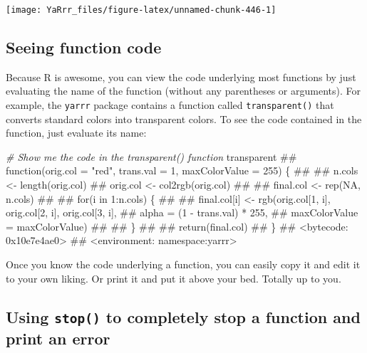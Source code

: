 \documentclass[]{book}
\newenvironment{Shaded}{\begin{snugshade}}{\end{snugshade}}
\newcommand{\CommentTok}[1]{\textcolor[rgb]{0.56,0.35,0.01}{\textit{#1}}}
\newcommand{\NormalTok}[1]{#1}
\theoremstyle{definition}
\theoremstyle{definition}
\theoremstyle{remark}
\begin{document}
\begin{center}\texttt{[image: YaRrr\_files/figure-latex/unnamed-chunk-446-1]} \end{center}

\subsection{Seeing function code}\label{seeing-function-code}

Because R is awesome, you can view the code underlying most functions by
just evaluating the name of the function (without any parentheses or
arguments). For example, the \texttt{yarrr} package contains a function
called \texttt{transparent()} that converts standard colors into
transparent colors. To see the code contained in the function, just
evaluate its name:

\begin{Shaded}
\begin{Highlighting}[]
\CommentTok{# Show me the code in the transparent() function}
\NormalTok{transparent}
\NormalTok{## function(orig.col = "red", trans.val = 1, maxColorValue = 255) \{}
\NormalTok{## }
\NormalTok{##   n.cols <- length(orig.col)}
\NormalTok{##   orig.col <- col2rgb(orig.col)}
\NormalTok{## }
\NormalTok{##   final.col <- rep(NA, n.cols)}
\NormalTok{## }
\NormalTok{##   for(i in 1:n.cols) \{}
\NormalTok{## }
\NormalTok{##     final.col[i] <- rgb(orig.col[1, i], orig.col[2, i], orig.col[3, i],}
\NormalTok{##                         alpha = (1 - trans.val) * 255,}
\NormalTok{##                         maxColorValue = maxColorValue)}
\NormalTok{## }
\NormalTok{##   \}}
\NormalTok{## }
\NormalTok{##   return(final.col)}
\NormalTok{## \}}
\NormalTok{## <bytecode: 0x10e7e4ae0>}
\NormalTok{## <environment: namespace:yarrr>}
\end{Highlighting}
\end{Shaded}

Once you know the code underlying a function, you can easily copy it and
edit it to your own liking. Or print it and put it above your bed.
Totally up to you.

\subsection{\texorpdfstring{Using \texttt{stop()} to completely stop a
function and print an
error}{Using stop() to completely stop a function and print an error}}\label{using-stop-to-completely-stop-a-function-and-print-an-error}
\end{document}
